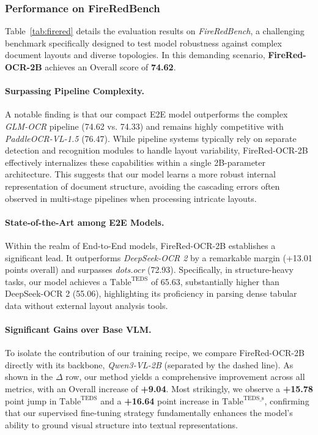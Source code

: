 \subsubsection{Performance on FireRedBench}
Table~\ref{tab:firered} details the evaluation results on \textit{FireRedBench}, a challenging benchmark specifically designed to test model robustness against complex document layouts and diverse topologies. In this demanding scenario, \textbf{FireRed-OCR-2B} achieves an Overall score of \textbf{74.62}.


\paragraph{Surpassing Pipeline Complexity.}
A notable finding is that our compact E2E model outperforms the complex \textit{GLM-OCR} pipeline (74.62 vs. 74.33) and remains highly competitive with \textit{PaddleOCR-VL-1.5} (76.47). While pipeline systems typically rely on separate detection and recognition modules to handle layout variability, FireRed-OCR-2B effectively internalizes these capabilities within a single 2B-parameter architecture. This suggests that our model learns a more robust internal representation of document structure, avoiding the cascading errors often observed in multi-stage pipelines when processing intricate layouts.

\paragraph{State-of-the-Art among E2E Models.}
Within the realm of End-to-End models, FireRed-OCR-2B establishes a significant lead. It outperforms \textit{DeepSeek-OCR 2} by a remarkable margin (+13.01 points overall) and surpasses \textit{dots.ocr} (72.93). Specifically, in structure-heavy tasks, our model achieves a $\text{Table}^{\text{TEDS}}$ of 65.63, substantially higher than DeepSeek-OCR 2 (55.06), highlighting its proficiency in parsing dense tabular data without external layout analysis tools.

\paragraph{Significant Gains over Base VLM.}
To isolate the contribution of our training recipe, we compare FireRed-OCR-2B directly with its backbone, \textit{Qwen3-VL-2B} (separated by the dashed line). As shown in the $\Delta$ row, our method yields a comprehensive improvement across all metrics, with an Overall increase of \textbf{+9.04}. Most strikingly, we observe a \textbf{+15.78} point jump in $\text{Table}^{\text{TEDS}}$ and a \textbf{+16.64} point increase in $\text{Table}^{\text{TEDS\_s}}$, confirming that our supervised fine-tuning strategy fundamentally enhances the model's ability to ground visual structure into textual representations.


